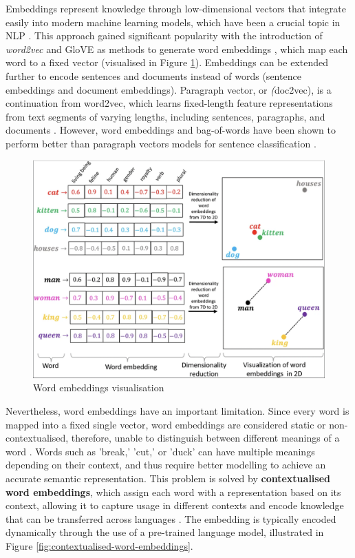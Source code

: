 Embeddings represent knowledge through low-dimensional vectors that integrate easily into modern machine learning models, which have been a crucial topic in NLP \cite{camacho-collados-2020-embeddings}. This approach gained significant popularity with the introduction of \textit{word2vec} and GloVE \cite{pennington-2014-glove} as methods to generate word embeddings \cite{mikolov-2013-embeddings}, which map each word to a fixed vector (visualised in Figure \ref{fig:word-embeddings}). Embeddings can be extended further to encode sentences and documents instead of words (sentence embeddings and document embeddings). Paragraph vector, or \textit(doc2vec), is a continuation from word2vec, which learns fixed-length feature representations from text segments of varying lengths, including sentences, paragraphs, and documents \cite{mikolov-2014-doc2vec}. However, word embeddings and bag-of-words have been shown to perform better than paragraph vectors models for sentence classification \cite{white-2015-how-well-sentence-embeddings}.


\begin{figure}[htbp]
    \centering
    \includegraphics[width=0.8\linewidth]{images/word_embeddings.png}
    \caption{Word embeddings visualisation \cite{narayanan-2019-word-embeddings}}
    \label{fig:word-embeddings}
\end{figure}


Nevertheless, word embeddings have an important limitation. Since every word is mapped into a fixed single vector, word embeddings are considered static or non-contextualised, therefore, unable to distinguish between different meanings of a word \cite{camacho-collados-2020-embeddings}. Words such as 'break,' 'cut,' or 'duck' can have multiple meanings depending on their context, and thus require better modelling to achieve an accurate semantic representation. This problem is solved by \textbf{contextualised word embeddings}, which assign each word with a representation based on its context, allowing it to capture usage in different contexts and encode knowledge that can be transferred across languages \cite{liu-2020-survey-contextual-embeddings}. The embedding is typically encoded dynamically through the use of a pre-trained language model, illustrated in Figure \ref{fig:contextualised-word-embeddings}.

